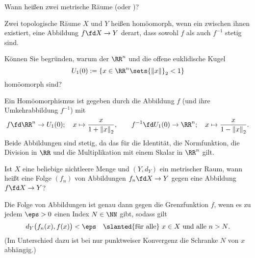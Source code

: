 \begin{frage}
  Wann heißen zwei metrische Räume  
  (oder )?
\end{frage}

\begin{antwort}
  Zwei topologische Räume $X$ und $Y$ heißen homöomorph, wenn ein 
   zwischen ihnen existiert, {\dasist} eine 
   Abbildung $f \fd X \to Y$ derart, dass sowohl 
  $f$ als auch $f^{-1}$ stetig sind. 
  \AntEnd
\end{antwort}

\begin{frage}\label{09_homokugel}
  Können Sie begründen, warum der $\RR^n$ und die offene euklidische 
  Kugel 
  \[
  U_1 (0 ) := \{ x\in \RR^n \sets {\| x \|}_2 < 1 \}
  \]
  homöomorph sind?
\end{frage}

\begin{antwort}
  Ein Homöomorphismus ist gegeben durch die Abbildung $f$ (und 
  ihre Umkehrabbildung $f^{-1}$) mit   
  \[
  f \fd \RR^n \to U_1(0); \quad 
  x \mapsto \frac{x}{1+{\| x\|}_2 }, \qquad
  f^{-1} \fd U_1(0) \to \RR^n; \quad 
  x \mapsto \frac{x}{1-{\| x\|}_2 }.  
  \]
  Beide Abbildungen sind stetig, da das für die Identität, 
  die Normfunktion, die Division in $\RR$ 
  und die Multiplikation mit einem Skalar in $\RR^n$ gilt.
  \AntEnd
\end{antwort}

\begin{frage} 
  Ist $X$ eine beliebige nichtleere Menge und $(Y,d_Y)$ ein metrischer Raum, 
  wann heißt eine Folge $(f_n)$ von Abbildungen $f_n \fd X\to Y$ 
   gegen eine Abbildung 
  $f \fd X\to Y$?
\end{frage}

\begin{antwort}
  Die Folge von Abbildungen ist genau dann  
  gegen die Grenzfunktion $f$,   
  wenn es zu jedem $\eps >0$ einen Index $N\in \NN$ gibt, 
  sodass gilt
  \[
  d_Y \big( f_n(x), f (x) \big) < \eps 
  \quad\text{\slanted{für alle} $x\in X$ und alle $n>N$}.
  \]
  (Im Unterschied dazu ist bei nur punktweiser Konvergenz die 
  Schranke $N$ von $x$ abhängig.) \AntEnd
\end{antwort}

